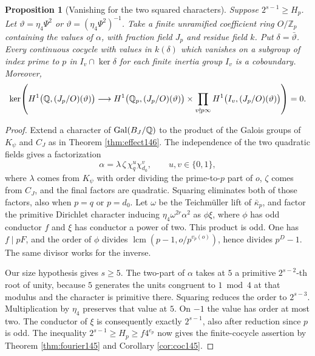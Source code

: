 \documentclass[a4paper,11pt]{article}
\newtheorem{proposition}{Proposition}[section]
\theoremstyle{definition}
\theoremstyle{remark}
\newcommand{\ZZ}{\mathbb Z}\newcommand{\ord}{\operatorname{ord}}
\numberwithin{equation}{section}
\begin{document}
\begin{proposition}[Vanishing for the two squared characters]
\label{prop:corner148}
Suppose \(2^{s-1}\ge H_p\). Let
\(\vartheta=\eta_4\Psi^2\) or \(\vartheta=(\eta_4\Psi^2)^{-1}\).
Take a finite unramified coefficient ring \(O/\ZZ_p\)
containing the values of \(\alpha\), with fraction field \(J_p\)
and residue field \(k\). Put \(\delta=\bar\vartheta\).
Every continuous cocycle with values in \(k(\delta)\) which
vanishes on a subgroup of index prime to \(p\) in
\(I_v\cap\ker\delta\) for each finite inertia group \(I_v\)
is a coboundary. Moreover,
\[
 \ker\!\left(
 H^1\big(\mathbb Q,(J_p/O)(\vartheta)\big)
  \longrightarrow H^1\big(\mathbb Q_p,(J_p/O)(\vartheta)\big)
       \times\prod_{v\nmid p\infty}
                 H^1\big(I_v,(J_p/O)(\vartheta)\big)\right)=0.
\]
\end{proposition}
\begin{proof}
Extend a character of \(\operatorname{Gal}(B_J/\mathbb Q)\) to the product of the
Galois groups of \(K_\psi\) and \(C_J\) as in
Theorem \ref{thm:effect146}.
The independence of the two quadratic fields gives a
factorization
\[
             \alpha=\lambda\,\zeta\,\chi_q^{u}\chi_{d_0}^{v},
             \qquad u,v\in\{0,1\},
\]
where \(\lambda\) comes from \(K_\psi\) with order dividing
the prime-to-\(p\) part of \(o\), \(\zeta\) comes from \(C_J\),
and the final factors are quadratic. Squaring eliminates both
of those factors, also when \(p=q\) or \(p=d_0\).
Let \(\omega\) be the Teichm\"uller lift of
\(\bar\kappa_p\), and factor the primitive Dirichlet character
inducing \(\eta_4\omega^{2r}\alpha^2\) as \(\phi\xi\), where
\(\phi\) has odd conductor \(f\) and \(\xi\) has conductor a
power of two. This product is odd. One has \(f\mid pF\), and
the order of \(\phi\) divides
\(\operatorname{lcm}(p-1,o/p^{v_p(o)})\), hence divides
\(p^D-1\). The same divisor works for the inverse.

Our size hypothesis gives \(s\ge5\). The two-part of
\(\alpha\) takes at \(5\) a primitive \(2^{s-2}\)-th root
of unity, because \(5\) generates the units congruent to
\(1\bmod4\) at that modulus and the character is primitive
there. Squaring reduces the order to \(2^{s-3}\).
Multiplication by \(\eta_4\) preserves that value at \(5\).
On \(-1\) the value has order at most two. The conductor of
\(\xi\) is consequently exactly \(2^{s-1}\), also after
reduction since \(p\) is odd. The inequality
\(2^{s-1}\ge H_p\ge f4^{e_p}\) now gives the finite-cocycle
assertion by Theorem \ref{thm:fourier145} and Corollary \ref{cor:coc145}.


\end{proof}
\end{document}

